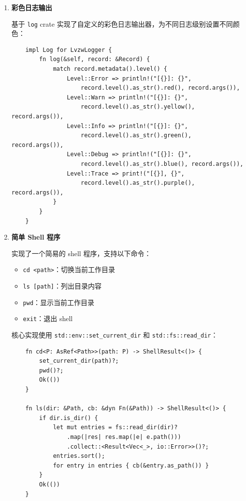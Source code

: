 \documentclass{SYSUReport}
\begin{document}
\begin{enumerate}[label=\arabic*.]
    \item \textbf{彩色日志输出}
    
    基于 \texttt{log} crate 实现了自定义的彩色日志输出器，为不同日志级别设置不同颜色：
    \begin{verbatim}
    impl Log for LvzwLogger {
        fn log(&self, record: &Record) {
            match record.metadata().level() {
                Level::Error => println!("[{}]: {}",
                    record.level().as_str().red(), record.args()),
                Level::Warn => println!("[{}]: {}",
                    record.level().as_str().yellow(), record.args()),
                Level::Info => println!("[{}]: {}",
                    record.level().as_str().green(), record.args()),
                Level::Debug => println!("[{}]: {}",
                    record.level().as_str().blue(), record.args()),
                Level::Trace => print!("[{}], {}",
                    record.level().as_str().purple(), record.args()),
            }
        }
    }
    \end{verbatim}
    
    \item \textbf{简单 Shell 程序}
    
    实现了一个简易的 shell 程序，支持以下命令：
    \begin{itemize}
        \item \texttt{cd <path>}：切换当前工作目录
        \item \texttt{ls [path]}：列出目录内容
        \item \texttt{pwd}：显示当前工作目录
        \item \texttt{exit}：退出 shell
    \end{itemize}
    
    核心实现使用 \texttt{std::env::set\_current\_dir} 和 \texttt{std::fs::read\_dir}：
    \begin{verbatim}
    fn cd<P: AsRef<Path>>(path: P) -> ShellResult<()> {
        set_current_dir(path)?;
        pwd()?;
        Ok(())
    }

    fn ls(dir: &Path, cb: &dyn Fn(&Path)) -> ShellResult<()> {
        if dir.is_dir() {
            let mut entries = fs::read_dir(dir)?
                .map(|res| res.map(|e| e.path()))
                .collect::<Result<Vec<_>, io::Error>>()?;
            entries.sort();
            for entry in entries { cb(&entry.as_path()) }
        }
        Ok(())
    }
    \end{verbatim}
    

\end{enumerate}
\end{document}
